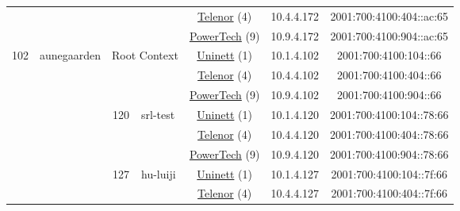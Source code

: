 \begin{small}
\begin{center}
\begin{longtable}{|c|c|c|c|c|c|c|c|}
  &  &  &  & \multicolumn{2}{|c|}{\tiny{\href{https://www.telenor.no}{Telenor} (4)}} & \tiny{10.4.4.172} & \tiny{2001:700:4100:404::ac:65} \\* \cline{5-5}\cline{6-6}\cline{7-7}\cline{8-8}
  &  &  &  & \multicolumn{2}{|c|}{\tiny{\href{http://www.powertech.no}{PowerTech} (9)}} & \tiny{10.9.4.172} & \tiny{2001:700:4100:904::ac:65} \\ \hline
 \multirow{27}{*}{\tiny{102}} & \multicolumn{1}{|l|}{\multirow{27}{*}{\tiny{aunegaarden}}} & \multicolumn{2}{|c|}{\multirow{3}{*}{\tiny{Root Context}}} & \multicolumn{2}{|c|}{\tiny{\href{https://www.uninett.no}{Uninett} (1)}} & \tiny{10.1.4.102} & \tiny{2001:700:4100:104::66} \\* \cline{5-5}\cline{6-6}\cline{7-7}\cline{8-8}
  &  & \multicolumn{2}{|c|}{} & \multicolumn{2}{|c|}{\tiny{\href{https://www.telenor.no}{Telenor} (4)}} & \tiny{10.4.4.102} & \tiny{2001:700:4100:404::66} \\* \cline{5-5}\cline{6-6}\cline{7-7}\cline{8-8}
  &  & \multicolumn{2}{|c|}{} & \multicolumn{2}{|c|}{\tiny{\href{http://www.powertech.no}{PowerTech} (9)}} & \tiny{10.9.4.102} & \tiny{2001:700:4100:904::66} \\* \cline{3-3}\cline{4-4}\cline{5-5}\cline{6-6}\cline{7-7}\cline{8-8}
  &  & \multirow{3}{*}{\tiny{120}} & \multicolumn{1}{|l|}{\multirow{3}{*}{\tiny{srl-test}}} & \multicolumn{2}{|c|}{\tiny{\href{https://www.uninett.no}{Uninett} (1)}} & \tiny{10.1.4.120} & \tiny{2001:700:4100:104::78:66} \\* \cline{5-5}\cline{6-6}\cline{7-7}\cline{8-8}
  &  &  &  & \multicolumn{2}{|c|}{\tiny{\href{https://www.telenor.no}{Telenor} (4)}} & \tiny{10.4.4.120} & \tiny{2001:700:4100:404::78:66} \\* \cline{5-5}\cline{6-6}\cline{7-7}\cline{8-8}
  &  &  &  & \multicolumn{2}{|c|}{\tiny{\href{http://www.powertech.no}{PowerTech} (9)}} & \tiny{10.9.4.120} & \tiny{2001:700:4100:904::78:66} \\* \cline{3-3}\cline{4-4}\cline{5-5}\cline{6-6}\cline{7-7}\cline{8-8}
  &  & \multirow{3}{*}{\tiny{127}} & \multicolumn{1}{|l|}{\multirow{3}{*}{\tiny{hu-luiji}}} & \multicolumn{2}{|c|}{\tiny{\href{https://www.uninett.no}{Uninett} (1)}} & \tiny{10.1.4.127} & \tiny{2001:700:4100:104::7f:66} \\* \cline{5-5}\cline{6-6}\cline{7-7}\cline{8-8}
  &  &  &  & \multicolumn{2}{|c|}{\tiny{\href{https://www.telenor.no}{Telenor} (4)}} & \tiny{10.4.4.127} & \tiny{2001:700:4100:404::7f:66} \\* \cline{5-5}\cline{6-6}\cline{7-7}\cline{8-8}

\end{longtable}
\end{center}
\end{small}
